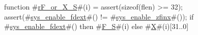 function #\hyperref[sailRISCVzrFzyorzyXzyS]{rF\_or\_X\_S}#(i) = {
  assert(sizeof(flen) >= 32);
  assert(#\hyperref[sailRISCVzsyszyenablezyfdext]{sys\_enable\_fdext}#() != #\hyperref[sailRISCVzsyszyenablezyzzfinx]{sys\_enable\_zfinx}#());
  if   #\hyperref[sailRISCVzsyszyenablezyfdext]{sys\_enable\_fdext}#()
  then #\hyperref[sailRISCVzFzyS]{F\_S}#(i)
  else #\hyperref[sailRISCVzX]{X}#(i)[31..0]
}
